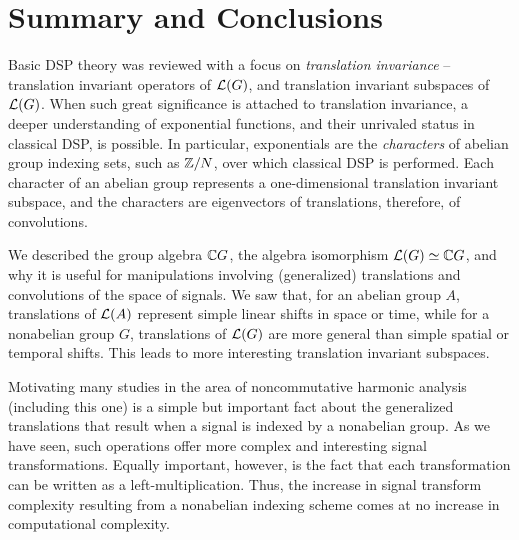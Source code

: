 %
\section{Summary and Conclusions}
Basic DSP theory was reviewed with a focus on 
\emph{translation invariance} -- translation invariant
operators of $\mathcal{L}(G)$, and translation invariant
subspaces of $\mathcal{L}(G)$. 
When such great significance is attached to translation invariance, 
a deeper understanding of exponential functions, and their 
unrivaled status in classical DSP, is possible.  
In particular, exponentials are the \emph{characters} 
of abelian group indexing sets, such as $\mathbb{Z}/N$, over which
classical DSP is performed.  
Each character of an abelian group represents a one-dimensional
translation invariant subspace, and the characters are eigenvectors
of translations, therefore, of convolutions. 

We described the group algebra $\mathbb{C} G$,
the algebra isomorphism $\mathcal{L}(G) \simeq \mathbb{C} G$, and why it is
useful for manipulations involving (generalized)
translations and convolutions of the space of signals. 
We saw that, for an abelian group $A$, translations of $\mathcal{L}(A)$
represent simple linear shifts in space or time, while for a nonabelian
group $G$, translations of $\mathcal{L}(G)$ are more general than
simple spatial or temporal shifts.  This leads to
more interesting translation invariant subspaces.

Motivating many studies in the area of noncommutative
harmonic analysis (including this one) is a simple
but important fact about the generalized translations that
result when a signal is indexed by a nonabelian group.
As we have seen, such operations offer more complex and
interesting signal transformations.  Equally important,
however, is the fact that each transformation can be written
as a left-multiplication. Thus, the increase in signal transform
complexity resulting from a nonabelian indexing scheme
comes at no increase in computational complexity. 



